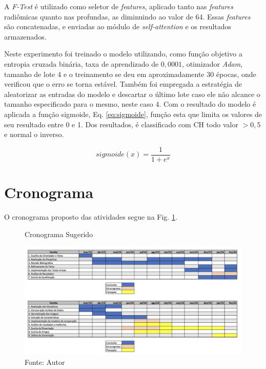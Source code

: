 A \textit{F-Test} é utilizado como seletor de \textit{features}, aplicado tanto nas \textit{features} radiômicas quanto nas profundas, as diminuindo ao valor de 64. Essas \textit{features} são concatenadas, e enviadas ao módulo de \textit{self-attention} e os resultados armazenados.

Neste experimento foi treinado o modelo utilizando, como função objetivo a entropia cruzada binária, taxa de aprendizado de $0,0001$, otimizador \textit{Adam}, tamanho de lote 4 e o treinamento se deu em aproximadamente 30 épocas, onde verificou que o erro se torna estável. Também foi empregada a estratégia de aleatorizar as entradas do modelo e descartar o último lote caso ele não alcance o tamanho especificado para o mesmo, neste caso 4. Com o resultado do modelo é aplicada a função sigmoide, Eq. \ref{eq:sigmoide}, função esta que limita os valores de seu resultado entre 0 e 1. Dos resultados, é classificado com CH todo valor $>0,5$ e normal o inverso.

\begin{equation}
\textit{sigmoide}(x) = \frac{1}{1 + e^x}
\label{eq:sigmoide}
\end{equation}

\section{Cronograma}
\label{sec:cronograma}

O cronograma proposto das atividades segue na Fig. \ref{fig:fig014}.

\begin{figure}[htbp]
    \centering
    \caption{Cronograma Sugerido}
    \includegraphics[width=1\textwidth]{figures/fig014.png}
    \caption*{Fonte: Autor}
    \label{fig:fig014}
\end{figure}

